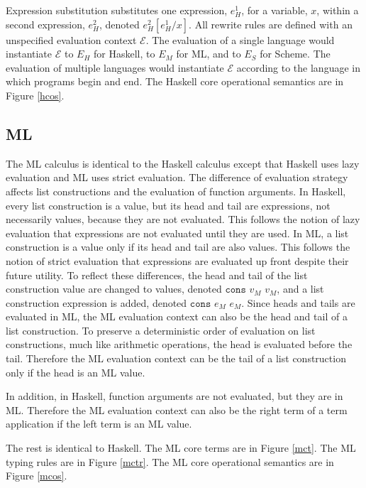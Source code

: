 

Expression substitution substitutes one expression, $e_{H}^{1}$, for a variable, $x$, within a second expression, $e_{H}^{2}$, denoted $e_{H}^{2}[e_{H}^{1}/x]$. All rewrite rules are defined with an unspecified evaluation context $\mathscr{E}$.  The evaluation of a single language would instantiate $\mathscr{E}$ to $E_{H}$ for Haskell, to $E_{M}$ for ML, and to $E_{S}$ for Scheme.  The evaluation of multiple languages would instantiate $\mathscr{E}$ according to the language in which programs begin and end.  The Haskell core operational semantics are in Figure \ref{hcos}.



\subsection{ML}

The ML calculus is identical to the Haskell calculus except that Haskell uses lazy evaluation and ML uses strict evaluation.  The difference of evaluation strategy affects list constructions and the evaluation of function arguments.  In Haskell, every list construction is a value, but its head and tail are expressions, not necessarily values, because they are not evaluated.  This follows the notion of lazy evaluation that expressions are not evaluated until they are used.  In ML, a list construction is a value only if its head and tail are also values.  This follows the notion of strict evaluation that expressions are evaluated up front despite their future utility.  To reflect these differences, the head and tail of the list construction value are changed to values, denoted $\mathtt{cons}$ $v_{M}$ $v_{M}$, and a list construction expression is added, denoted $\mathtt{cons}$ $e_{M}$ $e_{M}$.  Since heads and tails are evaluated in ML, the ML evaluation context can also be the head and tail of a list construction.  To preserve a deterministic order of evaluation on list constructions, much like arithmetic operations, the head is evaluated before the tail.  Therefore the ML evaluation context can be the tail of a list construction only if the head is an ML value.  

In addition, in Haskell, function arguments are not evaluated, but they are in ML.  Therefore the ML evaluation context can also be the right term of a term application if the left term is an ML value.

The rest is identical to Haskell.  The ML core terms are in Figure \ref{mct}.  The ML typing rules are in Figure \ref{mctr}.  The ML core operational semantics are in Figure \ref{mcos}.

